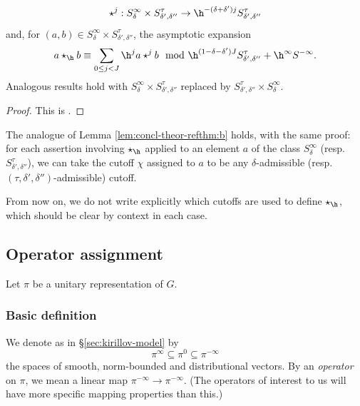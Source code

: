 \begin{theorem}
\begin{enumerate}[(i)]
\begin{equation*}
      \star^j : S^{\infty}_{\delta} \times S^{\tau}_{ \delta
        ', \delta ''}      \rightarrow \h^{-(\delta +  \delta ')
        j}
      S^{\tau}_{ \delta ', \delta ''}
    \end{equation*}
    and, for $(a,b) \in S^{\infty}_{\delta} \times S^{\tau}_{ \delta ', \delta ''}$, the asymptotic expansion
    \begin{equation*}
      a \star_{\h} b
      \equiv  \sum_{0 \leq j < J}
      \h^j a \star^j b
      \mod{
        \h^{(1- \delta - \delta') J}  S^{\tau}_{ \delta ', \delta ''}
        +
        \h^{\infty} S^{-\infty}}.
    \end{equation*}
    Analogous results hold with $S^{\infty}_{\delta} \times S^{\tau}_{ \delta ', \delta ''}$ replaced by $S^{\tau}_{ \delta ', \delta ''} \times S^{\infty}_{\delta}$.
  \end{enumerate}
\end{theorem}
\begin{proof}
  This is \cite[Thm 9.12]{2020arXiv201202187N}.
\end{proof}

The analogue of Lemma \ref{lem:concl-theor-refthm:b} holds, with the same proof: for each assertion involving $\star_{\h}$ applied to an element $a$ of the class $S_\delta^\infty$ (resp.\ $S_{\delta ', \delta ''}^{\tau}$), we can take the cutoff $\chi$ assigned to $a$ to be any $\delta$-admissible (resp.\ $(\tau, \delta ', \delta '')$-admissible) cutoff.

From now on, we do not write explicitly which cutoffs are used to define $\star_{\h}$, which should be clear by context in each case.

\subsection{Operator assignment}
Let $\pi$ be a unitary representation of $G$.

\subsubsection{Basic definition}\label{sec:basic-definition}
We denote as in \S\ref{sec:kirillov-model} by
\begin{equation*}
  \pi^\infty \subseteq \pi^0 \subseteq \pi^{-\infty}
\end{equation*}
the spaces of smooth, norm-bounded and distributional vectors.  By an \emph{operator} on $\pi$, we mean a linear map $\pi^{-\infty} \rightarrow \pi^{-\infty}$.  (The operators of interest to us will have more specific mapping properties than this.)

